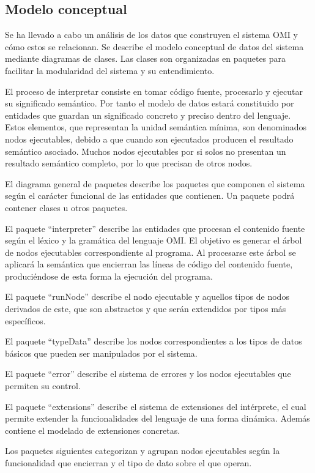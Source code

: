 \subsection {Modelo conceptual}
Se ha llevado a cabo un análisis de los datos que construyen
el sistema OMI y cómo estos se relacionan. Se describe el 
modelo conceptual de datos del sistema mediante diagramas de clases. Las 
clases son organizadas en paquetes para facilitar la modularidad del sistema
y su entendimiento. 

El proceso de interpretar consiste en tomar código fuente, procesarlo y ejecutar 
su significado semántico. Por tanto el modelo de datos estará constituido por
entidades que guardan un significado concreto y preciso dentro del lenguaje.
Estos elementos, que representan la unidad semántica mínima, 
son denominados nodos ejecutables, debido a que cuando 
son ejecutados producen el resultado semántico asociado.  Muchos nodos ejecutables
por si solos no presentan un resultado semántico completo, por lo que precisan de otros
nodos. 

El diagrama general de paquetes describe los paquetes que componen el 
sistema según el carácter funcional de las entidades que contienen. Un 
paquete podrá contener clases u otros paquetes.

El paquete ``interpreter'' describe las entidades que procesan  
el contenido fuente según el léxico y la gramática del lenguaje OMI. 
El objetivo es generar el árbol de nodos ejecutables correspondiente al
programa. Al procesarse este árbol se aplicará la semántica que encierran 
las líneas de código del contenido fuente, produciéndose de esta forma la ejecución del programa.


El paquete ``runNode'' describe el nodo ejecutable y aquellos tipos de nodos derivados
de este, que son abstractos y que serán extendidos por tipos más específicos.

El paquete ``typeData'' describe los nodos correspondientes a los tipos de datos básicos 
que pueden ser manipulados por el sistema. 

El paquete ``error'' describe el sistema de errores y los nodos ejecutables que permiten
su control.

El paquete ``extensions'' describe el sistema de extensiones del intérprete, el cual
permite extender la funcionalidades del lenguaje de una forma dinámica. Además contiene
el modelado de extensiones concretas.  

Los paquetes siguientes categorizan y agrupan nodos ejecutables según la funcionalidad 
que encierran y el tipo de dato sobre el que operan. 

